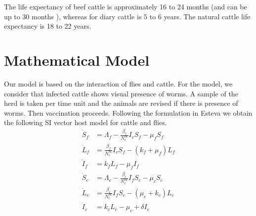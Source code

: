 \documentclass[preprint, 12pt]{elsarticle}
\begin{document}
\noindent The life expectancy of beef cattle is approximately 16 to 24 months (and can be up to 30 months \cite{stanley:2003}), whereas for diary cattle is 5 to 6 years. The natural cattle life expectancy is 18 to 22 years.


\section{Mathematical Model}

\noindent Our model is based on the interaction of flies and cattle. For the model, we consider that infected cattle shows visual presence of worms. A sample of the herd is taken per time unit and the animals are revised if there is presence of worms. Then vaccination proceeds.
Following the formulation in Esteva \cite{Esteva:1998} we obtain the
following SI vector host model for cattle and flies.
\begin{equation}\label{Eq:SIvectorhostmodel}
\begin{aligned}
    \dot{S}_f&=
        \Lambda_f-\frac{\beta_f}{N_c^{\infty}}I_cS_f-\mu_fS_f
    \\
    \dot{L}_f&=
        \frac{\beta_f}{N_c^{\infty}}I_cS_f-\left(k_f+\mu_f\right)L_f
    \\
    \dot{I}_f&=
        k_f L_f-\mu_fI_f
    \\
    \dot{S}_c&=
        \Lambda_c-\frac{\beta_c}{N_c^{\infty}}I_fS_c-\mu_cS_c
    \\
    \dot{L}_c&=
        \frac{\beta_c}{N_c^{\infty}}I_fS_c-\left(\mu_c+k_c\right)L_c
    \\
    \dot{I}_c&= k_c L_c-\mu_c +\delta I_c
    \\
\end{aligned}
\end{equation}
\end{document}
